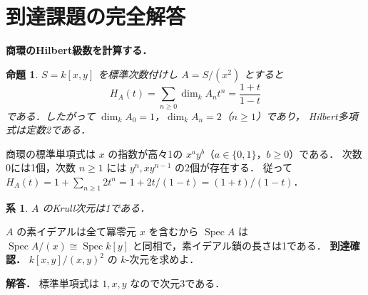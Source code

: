 \documentclass[a5paper,10pt,onecolumn]{jsarticle}
\makeatletter
\theoremstyle{mathnotetheorem}
\newtheorem{proposition}[theorem]{命題}
\newtheorem{corollary}[theorem]{系}
\renewcommand{\proofname}{証明}
\renewenvironment{proof}[1][\proofname]{%
  \par\pushQED{\qed}\normalfont\topsep4\p@\@plus2\p@\relax
  \trivlist\item[\hskip\labelsep\bfseries #1]\ignorespaces
}{\popQED\endtrivlist\@endpefalse}
\makeatother
\begin{document}
\section{到達課題の完全解答}
\noindent\textbf{商環のHilbert級数を計算する．}
\begin{proposition}
$S=k[x,y]$ を標準次数付けし
$A=S/(x^2)$ とすると
\[
H_A(t)=\sum_{n\ge0}\dim_kA_nt^n
=\frac{1+t}{1-t}
\]
である．したがって
$\dim_kA_0=1$，$\dim_kA_n=2$（$n\ge1$）であり，
Hilbert多項式は定数2である．
\end{proposition}
\begin{proof}
商環の標準単項式は $x$ の指数が高々1の
$x^ay^b$（$a\in\{0,1\}$，$b\ge0$）である．
次数0には1個，次数 $n\ge1$ には
$y^n,xy^{n-1}$ の2個が存在する．
従って
$H_A(t)=1+\sum_{n\ge1}2t^n
=1+2t/(1-t)=(1+t)/(1-t)$．
\end{proof}
\begin{corollary}
$A$ のKrull次元は1である．
\end{corollary}
\begin{proof}
$A$ の素イデアルは全て冪零元 $x$ を含むから
$\operatorname{Spec}A$ は
$\operatorname{Spec}A/(x)\cong\operatorname{Spec}k[y]$
と同相で，素イデアル鎖の長さは1である．
\end{proof}
\noindent\textbf{到達確認．}
$k[x,y]/(x,y)^2$ の $k$-次元を求めよ．
\par\noindent\textbf{解答．}
標準単項式は $1,x,y$ なので次元3である．
\end{document}
